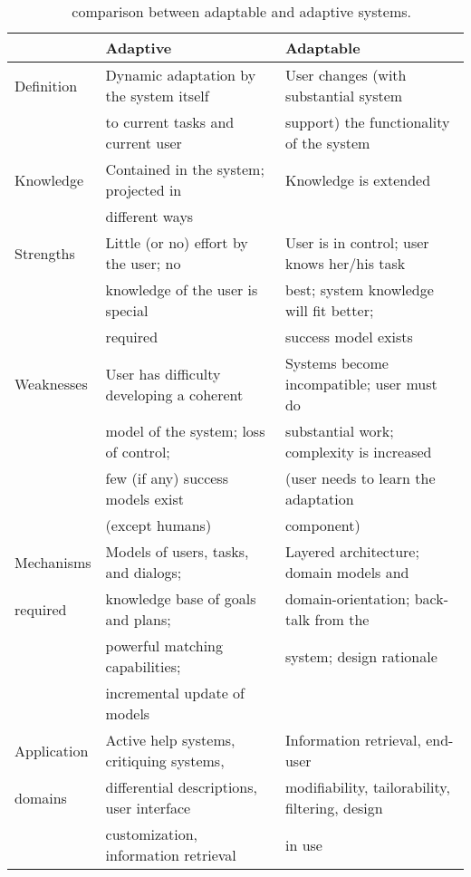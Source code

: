 \begin{table}
 \caption{~\citet{fischer_user_2001} comparison between adaptable and adaptive systems.}
 \label{tbl:fischer}
 \footnotesize
 \centering
\begin{tabular}{l l l}
  \hline
			& \textbf{Adaptive} & \textbf{Adaptable}\\
  \hline
	Definition	& Dynamic adaptation by the system itself 	& User changes (with substantial system		\\
			& to current tasks and current user		& support) the functionality of the system 	\\
	Knowledge	& Contained in the system; projected in 	& Knowledge is extended				\\
			& different ways				& ~						\\ 
	Strengths	& Little (or no) effort by the user; no 	& User is in control; user knows her/his task	\\
			& knowledge of the user is special		& best; system knowledge will fit better;	\\
			& required					& success model exists				\\
	Weaknesses	& User has difficulty developing a coherent	& Systems become incompatible; user must do	\\
			& model of the system; loss of control; 	& substantial work; complexity is increased	\\
			& few (if any) success models exist 		& (user needs to learn the adaptation		\\
			& (except humans)				& component) 					\\
	Mechanisms	& Models of users, tasks, and dialogs;		& Layered architecture; domain models and	\\
	required	& knowledge base of goals and plans;  		& domain-orientation; back-talk from the	\\
			& powerful matching capabilities;  		& system; design rationale			\\
			& incremental update of models			& ~ 						\\
	Application	& Active help systems, critiquing systems,	& Information retrieval, end-user		\\
	domains		& differential descriptions, user interface	& modifiability, tailorability, filtering, design\\
			& customization, information retrieval 		& in use					\\
  \hline
\end{tabular}
\end{table}

